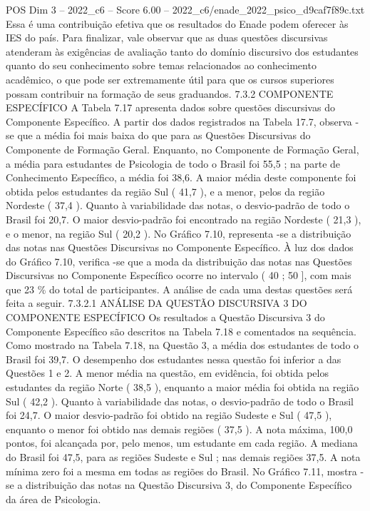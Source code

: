 \begin{textsample}{POS Dim 3 – 2022\_c6 – Score 6.00 – 2022\_c6/enade\_2022\_psico\_d9caf7f89c.txt}
Essa é uma contribuição efetiva que os resultados do Enade podem oferecer às IES do país.
Para finalizar, vale observar que as duas questões discursivas atenderam às exigências de avaliação tanto do domínio discursivo dos estudantes quanto do seu conhecimento sobre temas relacionados ao conhecimento acadêmico, o que pode ser extremamente útil para que os cursos superiores possam contribuir na formação de seus graduandos. 7.3.2 COMPONENTE ESPECÍFICO A Tabela 7.17 apresenta dados sobre questões discursivas do Componente Específico.
A partir dos dados registrados na Tabela 17.7, observa -se que a média foi mais baixa do que para as Questões Discursivas do Componente de Formação Geral.
Enquanto, no Componente de Formação Geral, a média para estudantes de Psicologia de todo o Brasil foi 55,5 ; na parte de Conhecimento Específico, a média foi 38,6.
A maior média deste componente foi obtida pelos estudantes da região Sul ( 41,7 ), e a menor, pelos da região Nordeste ( 37,4 ).
Quanto à variabilidade das notas, o desvio-padrão de todo o Brasil foi 20,7.
O maior desvio-padrão foi encontrado na região Nordeste ( 21,3 ), e o menor, na região Sul ( 20,2 ).
No Gráfico 7.10, representa -se a distribuição das notas nas Questões Discursivas no Componente Específico.
À luz dos dados do Gráfico 7.10, verifica -se que a moda da distribuição das notas nas Questões Discursivas no Componente Específico ocorre no intervalo ( 40 ; 50 ], com mais que 23 \% do total de participantes.
A análise de cada uma destas questões será feita a seguir. 7.3.2.1 ANÁLISE DA QUESTÃO DISCURSIVA 3 DO COMPONENTE ESPECÍFICO Os resultados a Questão Discursiva 3 do Componente Específico são descritos na Tabela 7.18 e comentados na sequência.
Como mostrado na Tabela 7.18, na Questão 3, a média dos estudantes de todo o Brasil foi 39,7.
O desempenho dos estudantes nessa questão foi inferior a das Questões 1 e 2.
A menor média na questão, em evidência, foi obtida pelos estudantes da região Norte ( 38,5 ), enquanto a maior média foi obtida na região Sul ( 42,2 ).
Quanto à variabilidade das notas, o desvio-padrão de todo o Brasil foi 24,7.
O maior desvio-padrão foi obtido na região Sudeste e Sul ( 47,5 ), enquanto o menor foi obtido nas demais regiões ( 37,5 ).
A nota máxima, 100,0 pontos, foi alcançada por, pelo menos, um estudante em cada região.
A mediana do Brasil foi 47,5, para as regiões Sudeste e Sul ; nas demais regiões 37,5.
A nota mínima zero foi a mesma em todas as regiões do Brasil.
No Gráfico 7.11, mostra -se a distribuição das notas na Questão Discursiva 3, do Componente Específico da área de Psicologia.

\end{textsample}
